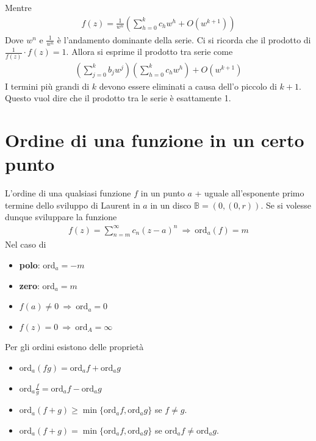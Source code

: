 \documentclass[a4paper, oneside]{article}
\begin{document}
Mentre 
\begin{gather*}
    f(z) = \frac{1}{w^{n}} \left(\sum_{h = 0}^{k} c_hw^{h} + O(w^{k + 1}) \right)
\end{gather*}
Dove $w^{n}$ e $\frac{1}{w^{n}}$ è l'andamento dominante della serie. Ci si ricorda che 
il prodotto di $\frac{1}{f(z)} \cdot f(z) = 1$. Allora si esprime il prodotto tra serie come 
\begin{gather*}
    \left(\sum_{j = 0}^{k} b_jw^{j} \right) \left(\sum_{h = 0}^{k} c_h w^{h} \right) + O(w^{k + 1})
\end{gather*}
I termini più grandi di $k$ devono essere eliminati a causa dell'o piccolo di $k +1$. Questo vuol dire 
che il prodotto tra le serie è esattamente 1. 

\section{Ordine di una funzione in un certo punto}
L'ordine di una qualsiasi funzione $f$ in un punto $a$ + uguale 
all'esponente primo termine dello sviluppo di Laurent in $a$ 
in un disco $\mathbb{B} = (0, (0, r))$. Se si volesse dunque sviluppare la 
funzione 
\begin{gather*}
    f(z) = \sum_{n = m}^{\infty } c_n(z - a)^{n} \ \Longrightarrow \ \boxed{\text{ord}_a(f) = m}
\end{gather*}
Nel caso di 
\begin{itemize}
    \item \textbf{polo}: ord$_{a} = -m$ 
    \item \textbf{zero}: ord$_{a} = m$
    \item $f(a) \neq 0 \ \Longrightarrow \ \text{ord}_a = 0$
    \item $f(z) = 0 \ \Longrightarrow \ \text{ord}_A = \infty $
\end{itemize}
Per gli ordini esistono delle proprietà
\begin{itemize}
    \item ord$_a(fg) = \text{ord}_a f + \text{ord}_a g$
    \item ord$_a\frac{f}{g} = \text{ord}_a f - \text{ord}_a g$
    \item ord$_a(f + g) \geq \min \{\text{ord}_a f, \text{ord}_a g\}$ se $f \neq g$.
    \item ord$_a(f + g) = \min \{\text{ord}_a f, \text{ord}_a g\}$ se $\text{ord}_af \neq \text{ord}_ag$.
\end{itemize}
\end{document}
